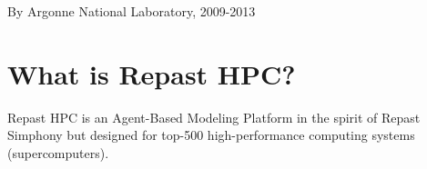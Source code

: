 By Argonne National Laboratory, 2009-\/2013\hypertarget{index_intro_sec}{}\section{What is Repast H\-P\-C?}\label{index_intro_sec}
Repast H\-P\-C is an Agent-\/\-Based Modeling Platform in the spirit of Repast Simphony but designed for top-\/500 high-\/performance computing systems (supercomputers). 